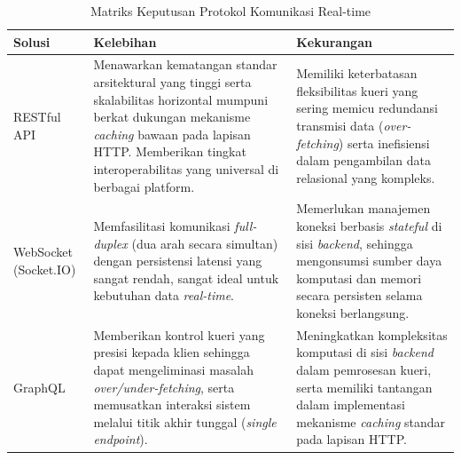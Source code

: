 \begin{table}[htbp]
    \centering
    \caption{Matriks Keputusan Protokol Komunikasi Real-time}
    \label{tab:matriks_realtime}
    \begin{tabularx}{\textwidth}{|l|X|X|}
        \hline
        \textbf{Solusi} & \textbf{Kelebihan} & \textbf{Kekurangan} \\
        \hline
        RESTful API & Menawarkan kematangan standar arsitektural yang tinggi serta skalabilitas horizontal mumpuni berkat dukungan mekanisme \textit{caching} bawaan pada lapisan HTTP. Memberikan tingkat interoperabilitas yang universal di berbagai platform. & Memiliki keterbatasan fleksibilitas kueri yang sering memicu redundansi transmisi data (\textit{over-fetching}) serta inefisiensi dalam pengambilan data relasional yang kompleks. \\
        \hline
        WebSocket (Socket.IO) & Memfasilitasi komunikasi \textit{full-duplex} (dua arah secara simultan) dengan persistensi latensi yang sangat rendah, sangat ideal untuk kebutuhan data \textit{real-time}. & Memerlukan manajemen koneksi berbasis \textit{stateful} di sisi \textit{backend}, sehingga mengonsumsi sumber daya komputasi dan memori secara persisten selama koneksi berlangsung. \\
        \hline
        GraphQL & Memberikan kontrol kueri yang presisi kepada klien sehingga dapat mengeliminasi masalah \textit{over/under-fetching}, serta memusatkan interaksi sistem melalui titik akhir tunggal (\textit{single endpoint}). & Meningkatkan kompleksitas komputasi di sisi \textit{backend} dalam pemrosesan kueri, serta memiliki tantangan dalam implementasi mekanisme \textit{caching} standar pada lapisan HTTP. \\
        \hline
    \end{tabularx}
\end{table}